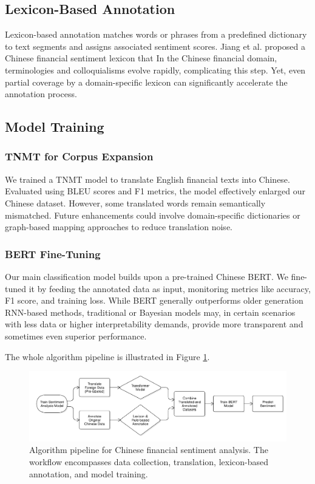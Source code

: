 \documentclass[12pt]{article}
\begin{document}
\subsection{Lexicon-Based Annotation}

Lexicon-based annotation matches words or phrases from a predefined dictionary to text segments and assigns associated sentiment scores. Jiang et al. \cite{ref3, ref4} proposed a Chinese financial sentiment lexicon that In the Chinese financial domain, terminologies and colloquialisms evolve rapidly, complicating this step. Yet, even partial coverage by a domain-specific lexicon can significantly accelerate the annotation process. 

\subsection{Model Training}
\subsubsection{TNMT for Corpus Expansion}
\label{subsec:TNMTperf}
We trained a TNMT model to translate English financial texts into Chinese. Evaluated using BLEU scores and F1 metrics, the model effectively enlarged our Chinese dataset. However, some translated words remain semantically mismatched. Future enhancements could involve domain-specific dictionaries or graph-based mapping approaches to reduce translation noise.

\subsubsection{BERT Fine-Tuning}
Our main classification model builds upon a pre-trained Chinese BERT. We fine-tuned it by feeding the annotated data as input, monitoring metrics like accuracy, F1 score, and training loss. While BERT generally outperforms older generation RNN-based methods, traditional or Bayesian models may, in certain scenarios with less data or higher interpretability demands, provide more transparent and sometimes even superior performance.

The whole algorithm pipeline is illustrated in Figure \ref{fig:pipeline}.\

\begin{figure}[!ht]
	\centering
	\includegraphics[width=\textwidth]{pipeline.png}
	\caption{Algorithm pipeline for Chinese financial sentiment analysis. The workflow encompasses data collection, translation, lexicon-based annotation, and model training.}
	\label{fig:pipeline}
\end{figure}
\end{document}
